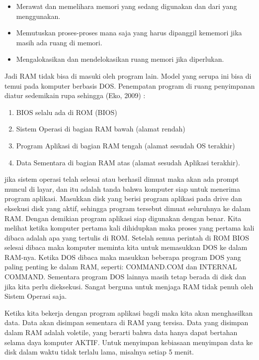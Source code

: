 \begin{itemize}

\item Merawat dan memelihara  memori yang sedang digunakan dan dari yang menggunakan.

\item Memutuskan proses-proses mana saja yang harus dipanggil kememori jika masih ada ruang di memori.

\item Mengalokasikan dan mendelokasikan ruang memori jika diperlukan.

\end{itemize}

Jadi  RAM tidak bisa di masuki oleh program lain. Model yang  serupa ini bisa di temui pada komputer berbasis DOS.
Penempatan program di ruang penyimpanan diatur sedemikain rupa sehingga (Eko, 2009) :

\begin{enumerate}

\item BIOS selalu ada di ROM (BIOS)
\item Sistem Operasi  di bagian RAM bawah (alamat rendah)
\item Program Aplikasi di bagian RAM tengah (alamat sesudah OS terakhir)
\item Data Sementara di bagian RAM atas (alamat sesudah Aplikasi terakhir).

\end{enumerate}

jika sistem operasi telah selesai atau berhasil dimuat maka akan ada prompt muncul di layar, dan itu adalah tanda bahwa komputer siap untuk menerima program aplikasi. Masukkan disk yang berisi program aplikasi pada drive dan eksekusi disk yang aktif, sehingga program tersebut dimuat seluruhnya ke dalam RAM. Dengan demikian program aplikasi siap digunakan dengan benar. Kita melihat ketika komputer pertama kali dihidupkan maka proses yang pertama kali dibaca adalah apa yang tertulis di ROM. Setelah semua perintah di ROM BIOS selesai dibaca maka komputer meminta kita untuk memasukkan DOS ke dalam RAM-nya. Ketika DOS dibaca maka masukkan beberapa program DOS yang paling penting ke dalam RAM, seperti: COMMAND.COM dan INTERNAL COMMAND. Sementara program DOS lainnya masih tetap berada di disk dan jika kita perlu dieksekusi. Sangat berguna untuk menjaga RAM tidak penuh oleh Sistem Operasi saja.

Ketika kita bekerja dengan program aplikasi bagdi maka kita akan menghasilkan data. Data akan disimpan sementara di RAM yang tersisa. Data yang disimpan dalam RAM adalah voletile, yang berarti bahwa data hanya dapat bertahan selama daya komputer AKTIF. Untuk menyimpan kebiasaan menyimpan data ke disk dalam waktu tidak terlalu lama, misalnya setiap 5 menit.

